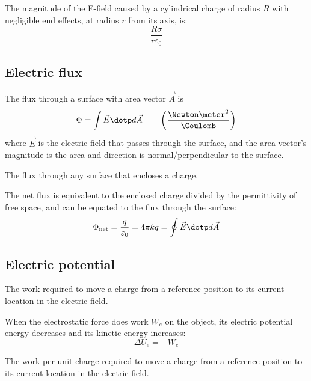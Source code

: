 \begin{example}
  The magnitude of the E-field caused by a cylindrical charge of radius $R$ with negligible end effects, at radius $r$ from its axis, is:
  \[
    \frac{R\sigma}{r\varepsilon_0}
  \]
\end{example}

\subsection{Electric flux}

\begin{definition}
  The flux through a surface with area vector $\vec{A}$ is
  \[
    \Phi = \int \vec{E} \dotp d\vec{A} \qquad \left(\frac{\Newton \meter^2}{\Coulomb}\right)
  \]
  where $\vec{E}$ is the electric field that passes through the surface, and the area vector's magnitude is the area and direction is normal/perpendicular to the surface.
\end{definition}

\begin{definition}
  The flux through any surface that encloses a charge.
\end{definition}

\begin{namedtheorem}
  The net flux is equivalent to the enclosed charge divided by the permittivity of free space, and can be equated to the flux through the surface:
  \[
    \Phi_{\text{net}} = \frac{q}{\varepsilon_0} = 4\pi k q = \oint \vec{E} \dotp d\vec{A}
  \]
\end{namedtheorem}

\subsection{Electric potential}

\begin{definition}
  The work required to move a charge from a reference position to its current location in the electric field.

  When the electrostatic force does work $W_e$ on the object, its electric potential energy decreases and its kinetic energy increases:
  \[
    \Delta U_e = -W_e
  \]
\end{definition}

\begin{definition}
  The work per unit charge required to move a charge from a reference position to its current location in the electric field.
\end{definition}


